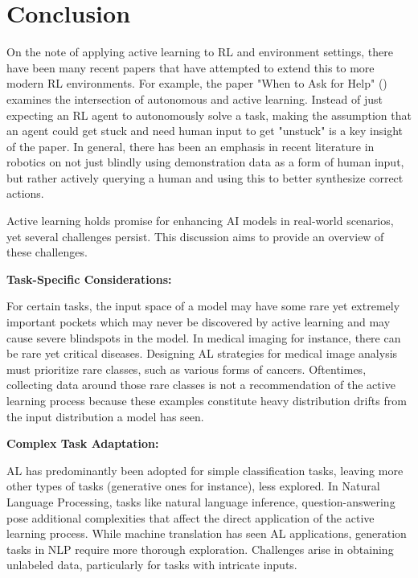 \documentclass[
  letterpaper,
  numbers=noenddot,
  DIV=11,
  oneside]{scrreprt}
\theoremstyle{remark}
\begin{document}
\section{Conclusion}\label{conclusion}

On the note of applying active learning to RL and environment settings,
there have been many recent papers that have attempted to extend this to
more modern RL environments. For example, the paper "When to Ask for
Help" () examines the
intersection of autonomous and active learning. Instead of just
expecting an RL agent to autonomously solve a task, making the
assumption that an agent could get stuck and need human input to get
"unstuck" is a key insight of the paper. In general, there has been an
emphasis in recent literature in robotics on not just blindly using
demonstration data as a form of human input, but rather actively
querying a human and using this to better synthesize correct actions.

Active learning holds promise for enhancing AI models in real-world
scenarios, yet several challenges persist. This discussion aims to
provide an overview of these challenges.

\textbf{Task-Specific Considerations:}

For certain tasks, the input space of a model may have some rare yet
extremely important pockets which may never be discovered by active
learning and may cause severe blindspots in the model. In medical
imaging for instance, there can be rare yet critical diseases. Designing
AL strategies for medical image analysis must prioritize rare classes,
such as various forms of cancers. Oftentimes, collecting data around
those rare classes is not a recommendation of the active learning
process because these examples constitute heavy distribution drifts from
the input distribution a model has seen.

\textbf{Complex Task Adaptation:}

AL has predominantly been adopted for simple classification tasks,
leaving more other types of tasks (generative ones for instance), less
explored. In Natural Language Processing, tasks like natural language
inference, question-answering pose additional complexities that affect
the direct application of the active learning process. While machine
translation has seen AL applications, generation tasks in NLP require
more thorough exploration. Challenges arise in obtaining unlabeled data,
particularly for tasks with intricate inputs.
\end{document}
